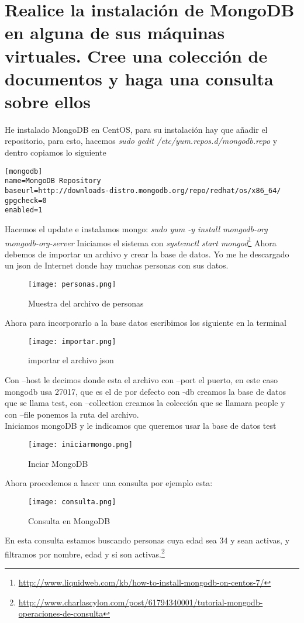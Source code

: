 \section{Realice la instalación de MongoDB en alguna de sus máquinas virtuales. Cree una colección de documentos y haga una consulta sobre ellos}
He instalado MongoDB en CentOS, para su instalación hay que añadir el repositorio, para esto, hacemos \textit{sudo gedit /etc/yum.repos.d/mongodb.repo}
y dentro copiamos lo siguiente
\begin{verbatim}
[mongodb]
name=MongoDB Repository
baseurl=http://downloads-distro.mongodb.org/repo/redhat/os/x86_64/
gpgcheck=0
enabled=1
\end{verbatim}
Hacemos el update e instalamos mongo: \textit{sudo yum -y install mongodb-org mongodb-org-server}
Iniciamos el sistema con \textit{systemctl start mongod}\footnote{\url{http://www.liquidweb.com/kb/how-to-install-mongodb-on-centos-7/}}
Ahora debemos de importar un archivo y crear la base de datos. Yo me he descargado un json de Internet donde hay muchas personas con sus datos.
\begin{figure}[H] 
\centering
\texttt{[image: personas.png]}  
\label{figura25:}
\caption{Muestra del archivo de personas}
\end{figure}
Ahora para incorporarlo a la base datos escribimos los siguiente en la terminal
\begin{figure}[H] 
\centering
\texttt{[image: importar.png]}  
\label{figura26:}
\caption{importar el archivo json}
\end{figure}
Con --host le decimos donde esta el archivo con --port el puerto, en este caso mongodb usa 27017, que es el de por defecto con -db creamos la base de datos que se llama test, con --collection creamos la colección que se llamara people y con --file ponemos la ruta del archivo.
\\Iniciamos mongoDB y le indicamos que queremos usar la base de datos test
\begin{figure}[H] 
\centering
\texttt{[image: iniciarmongo.png]}  
\label{figura27:}
\caption{Inciar MongoDB}
\end{figure}
Ahora procedemos a hacer una consulta por ejemplo esta:
\begin{figure}[H] 
\centering
\texttt{[image: consulta.png]}  
\label{figura28:}
\caption{Consulta en MongoDB}
\end{figure}
En esta consulta estamos buscando personas cuya edad sea 34 y sean activas, y filtramos por nombre, edad y si son activas.\footnote{\url{http://www.charlascylon.com/post/61794340001/tutorial-mongodb-operaciones-de-consulta}}

